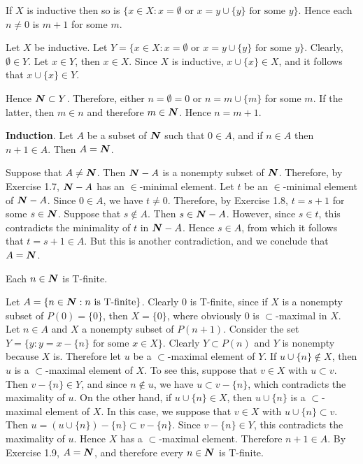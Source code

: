  If $X$ is inductive then so is
$\{ x \in X : x = \emptyset \text{ or } x = y 
\cup \{ y \} \text{ for some } y \}$. Hence each 
$n \neq 0$ is $m + 1$ for some $m$.
\begin{solution}
  Let $X$ be inductive. Let 
  $Y = \{ x \in X : x = \emptyset \text{ or } x = y 
  \cup \{ y \} \text{ for some } y \}$. Clearly, 
  $\emptyset \in Y$. Let $x \in Y$, then $x \in X$. Since $X$ is
  inductive, $x \cup \{ x \} \in X$, and it follows that 
  $x \cup \{ x \} \in Y$.

  Hence $\boldsymbol{N} \subset Y$. Therefore, either $n = \emptyset = 0$ or 
  $n = m \cup \{ m \}$ for some $m$. If the latter, then $m \in n$ and
  therefore $m \in \boldsymbol{N}$. Hence $n = m + 1$.
\end{solution}

 \textbf{Induction}. Let $A$ be a subset of $\boldsymbol{N}$ such that
$0 \in A$, and if $n \in A$ then $n + 1 \in A$. Then $A = \boldsymbol{N}$.
\begin{solution}
  Suppose that $A \neq \boldsymbol{N}$. Then $\boldsymbol{N} - A$ is a nonempty subset of
  $\boldsymbol{N}$. Therefore, by Exercise 1.7, $\boldsymbol{N} - A$ has an $\in$-minimal
  element. Let $t$ be an $\in$-minimal element of $\boldsymbol{N} - A$. Since 
  $0 \in A$, we have $t \neq 0$. Therefore, by Exercise 1.8, 
  $t = s + 1$ for some $s \in \boldsymbol{N}$. Suppose that $s \notin A$. Then 
  $s \in \boldsymbol{N} - A$. However, since $s \in t$, this contradicts the
  minimality of $t$ in $\boldsymbol{N} - A$. Hence $s \in A$, from which it follows
  that $t = s + 1 \in A$. But this is another contradiction, and we
  conclude that $A = \boldsymbol{N}$.
\end{solution}

 Each $n \in \boldsymbol{N}$ is T-finite.
\begin{solution}
  Let $A = \{ n \in \boldsymbol{N} : n \text{ is T-finite} \}$. Clearly $0$ is
  T-finite, since if $X$ is a nonempty subset of $P(0) = \{ 0 \}$, then 
  $X = \{ 0 \}$, where obviously $0$ is $\subset$-maximal in $X$. Let 
  $n \in A$ and $X$ a nonempty subset of $P(n + 1)$. Consider the set 
  $Y = \{ y : y = x - \{ n \} \text{ for some } x \in X \}$. Clearly 
  $Y \subset P(n)$ and $Y$ is nonempty because $X$ is. Therefore let $u$ be
  a $\subset$-maximal element of $Y$. If $u \cup \{ n \} \notin X$, then
  $u$ is a $\subset$-maximal element of $X$. To see this, suppose that 
  $v \in X$ with $u \subset v$. Then $v - \{ n \} \in Y$, and since 
  $n \notin u$, we have $u \subset v - \{ n \}$, which contradicts the
  maximality of $u$. On the other hand, if $u \cup \{ n \} \in X$, then 
  $u \cup \{ n \}$ is a $\subset$-maximal element of $X$. In this case, we
  suppose that $v \in X$ with $u \cup \{ n \} \subset v$. Then 
  $u = (u \cup \{ n \}) - \{ n \} \subset v - \{ n \}$. Since 
  $v - \{ n \} \in Y$, this contradicts the maximality of $u$. Hence 
  $X$ has a $\subset$-maximal element. Therefore $n + 1 \in A$. By Exercise
  1.9, $A = \boldsymbol{N}$, and therefore every $n \in \boldsymbol{N}$ is T-finite.
\end{solution}

